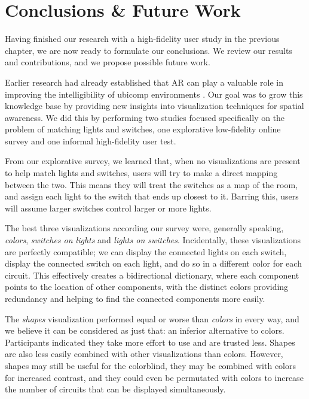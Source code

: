 \chapter{Conclusions \& Future Work} \label{chap:concl}
Having finished our research with a high-fidelity user study in the previous chapter, we are now ready to formulate our conclusions. We review our results and contributions, and we propose possible future work.

Earlier research had already established that AR can play a valuable role in improving the intelligibility of ubicomp environments \cite{bau2008octopocus, vermeulen2009bet, vermeulen2012understanding, vermeulen2013intelligibility}. Our goal was to grow this knowledge base by providing new insights into visualization techniques for spatial awareness. We did this by performing two studies focused specifically on the problem of matching lights and switches, one explorative low-fidelity online survey and one informal high-fidelity user test.

From our explorative survey, we learned that, when no visualizations are present to help match lights and switches, users will try to make a direct mapping between the two. This means they will treat the switches as a map of the room, and assign each light to the switch that ends up closest to it. Barring this, users will assume larger switches control larger or more lights.

The best three visualizations according our survey were, generally speaking, \textit{colors}, \textit{switches on lights} and \textit{lights on switches}. Incidentally, these visualizations are perfectly compatible; we can display the connected lights on each switch, display the connected switch on each light, and do so in a different color for each circuit. This effectively creates a bidirectional dictionary, where each component points to the location of other components, with the distinct colors providing redundancy and helping to find the connected components more easily.

The \textit{shapes} visualization performed equal or worse than \textit{colors} in every way, and we believe it can be considered as just that: an inferior alternative to colors. Participants indicated they take more effort to use and are trusted less. Shapes are also less easily combined with other visualizations than colors. However, shapes may still be useful for the colorblind, they may be combined with colors for increased contrast, and they could even be permutated with colors to increase the number of circuits that can be displayed simultaneously.

